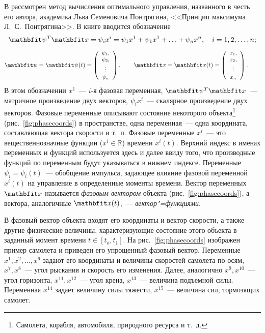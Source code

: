 \documentclass[a4paper,14pt, openany, twoside, draft]{extbook} %
\begin{document}
В \cite{pontr} рассмотрен метод вычисления оптимального управления, названного в честь его автора, академика Льва Семеновича Понтрягина, <<Принцип максимума Л.~С.~Понтрягина>>.  В книге вводится обозначение
$$
\vecpsi^T\vecx=\psi_ix^i=\psi_1x^1+\psi_1x^1+\ldots +\psi_nx^n,\quad i=1,2,\ldots,n;
$$
$$
\vecpsi=\vecpsi(t)=\left({\small
  \begin{array}{c}
    \psi_1,\\ \psi_2,\\ \vdots\\ \psi_n
  \end{array}}
\right),\qquad\vecx=\vecx(t)=\left({\small
  \begin{array}{c}
    x_1,\\ x_2,\\ \vdots\\ x_n
  \end{array}}
\right).\qquad
$$
В этом обозначении $x^1$~--- $i$-я фазовая переменная, $\vecpsi^T\vecx$~--- матричное произведение двух векторов, $\psi_ix^i$~--- скалярное произведение двух векторов.  Фазовые переменные описывают состояние некоторого объекта\footnote{Самолета, корабля, автомобиля, природного ресурса и т.~д.} (рис.~\ref{fig:phasecoords}) в пространстве, одна переменная~--- одна координата, составляющая вектора скорости и т.~п.  Фазовые переменные $x^i$~--- это вещественнозначные функции ($x^i\in\mathbb{R}$) времени $x^i(t)$.  Верхний индекс в именах переменных и функций используется здесь и далее ввиду того, что производные функций по переменным будут указываться в нижнем индексе.  Переменные $\psi_i=\psi_i(t)$~--- обобщение импульса, задающее влияние фазовой переменной $x^i(t)$ на управление в определенные моменты времени.  Вектор переменных $\vecx$ называется \emph{фазовым вектором} объекта (рис.~\ref{fig:phasecoords}), а вектора, аналогичные $\vecx(t)$,~--- \emph{вектор"=функциями}.

В фазовый вектор объекта входят его координаты и вектор скорости, а также другие физические величины, характеризующие состояние этого объекта в заданный момент времени $t\in[t_o,t_1]$.  На рис.~\ref{fig:phasecoords} изображен пример самолета и приведен его упрощенный фазовый вектор.  Переменные $x^1,x^2,\ldots,x^6$ задают его координаты и величины скоростей самолета по осям, $x^7,x^8$~--- угол рыскания и скорость его изменения.  Далее, аналогично $x^9,x^{10}$~--- угол горизонта, $x^{11},x^{12}$~--- угол крена, $x^{13}$~--- величина подъемной силы.  Переменная $x^{14}$ задает величину силы тяжести, $x^{15}$~--- величина сил, тормозящих самолет.
\end{document}
